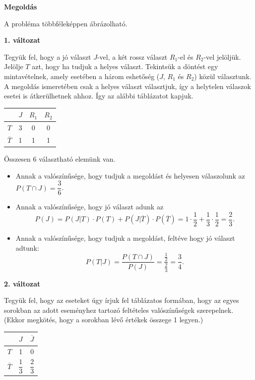 \documentclass[a4paper]{article}
\begin{document}
\noindent \textbf{Megoldás}

\noindent A probléma többféleképpen ábrázolható.

\noindent \textbf{1. változat}

Tegyük fel, hogy a jó választ $J$-vel, a két rossz választ $R_1$-el és $R_2$-vel jelöljük.
Jelölje $T$ azt, hogy ha tudjuk a helyes választ.
Tekintsük a döntést egy mintavételnek, amely esetében a három eshetőség ($J$, $R_1$ és $R_2$) közül választunk.
A megoldás ismeretében csak a helyes választ választjuk, így a helytelen válaszok esetei is átkerülhetnek ahhoz.
Így az alábbi táblázatot kapjuk.

\medskip

\begin{center}
\begin{tabular}{l|c|c|c|}
& $J$ & $R_1$ & $R_2$ \\
\hline
$T$ & 3 & 0 & 0 \\
\hline
$\overline{T}$ & 1 & 1 & 1 \\
\hline
\end{tabular}
\end{center}

\medskip

Összesen 6 választható elemünk van.
\begin{itemize}
\item Annak a valószínűsége, hogy tudjuk a megoldást és helyesen válaszolunk az $P(T \cap J) = \dfrac{3}{6}$.
\item Annak a valószínűsége, hogy jó választ adunk az
\[
P(J) = P(J|T) \cdot P(T) + P(J|\overline{T}) \cdot P(\overline{T})
= 1 \cdot \dfrac{1}{2} + \dfrac{1}{3} \cdot \dfrac{1}{2}
= \dfrac{2}{3}.
\]
\item Annak a valószínűsége, hogy tudjuk a megoldást, feltéve hogy jó választ adtunk:
\[
P(T|J) = \dfrac{P(T \cap J)}{P(J)} =
\dfrac{\frac{1}{2}}{\frac{2}{3}} =
\dfrac{3}{4}.
\]
\end{itemize}

\noindent \textbf{2. változat}

Tegyük fel, hogy az eseteket úgy írjuk fel táblázatos formában, hogy az egyes sorokban az adott eseményhez tartozó feltételes valószínűségek szerepelnek. (Ekkor megkötés, hogy a sorokban lévő értékek összege 1 legyen.)

\medskip

\begin{center}
\begin{tabular}{l|c|c|}
& $J$ & $\overline{J}$ \\
\hline
$T$ & 1 & 0 \\
\hline
$\overline{T}$ & $\dfrac{1}{3}$ & $\dfrac{2}{3}$ \\
\hline
\end{tabular}
\end{center}
\end{document}
